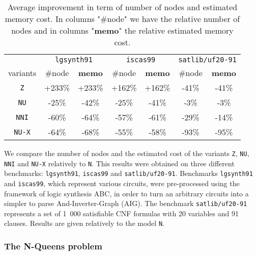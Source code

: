 \documentclass[a4paper,10pt]{article}
\begin{document}
\begin{table}
\center
\begin{tabular}{c | c | c | c | c | c | c }
& \multicolumn{2}{c|}{\texttt{lgsynth91}} & \multicolumn{2}{c|}{\texttt{iscas99}} & \multicolumn{2}{c}{\texttt{satlib/uf20-91}} \\
variants      & \#node & \textbf{memo} & \#node & \textbf{memo} & \#node & \textbf{memo} \\
\texttt{Z}    & +233\% & +233\%        & +162\% & +162\%        & -41\%  & -41\%        \\
\texttt{NU}   & -25\%  & -42\%         & -25\%  & -41\%         & -3\%   & -3\%         \\
\texttt{NNI}  & -60\%  & -64\%         & -57\%  & -61\%         & -29\%  & -14\%        \\
\texttt{NU-X} & -64\%  & -68\%         & -55\%  & -58\%         & -93\%  & -95\%        \\
\end{tabular}
\caption{Average improvement in term of number of nodes and estimated memory cost.
In columns "\#node" we have the relative number of nodes and in columns "\textbf{memo}" the relative estimated memory cost.
}
\label{results}
\end{table}

We compare the number of nodes and the estimated cost of the variants \texttt{Z}, \texttt{NU}, \texttt{NNI} and \texttt{NU-X} relatively to \texttt{N}.
This results were obtained on three different benchmarks: \texttt{lgsynth91}\cite{BenchLgsynth91}, \texttt{iscas99}\cite{BenchIscas99} and \texttt{satlib/uf20-91}\cite{BenchSatlib}.
Benchmarks \texttt{lgsynth91} and \texttt{iscas99}, which represent various circuits, were pre-processed using the framework of logic synthesis ABC\cite{Abc}, in order to turn an arbitrary circuits into a simpler to parse And-Inverter-Graph (AIG).
The benchmark \texttt{satlib/uf20-91} represents a set of 1~000 satisfiable CNF formulas with 20 variables and 91 clauses.
Results are given relatively to the model \texttt{N}.


\subsubsection{The N-Queens problem}
\end{document}
